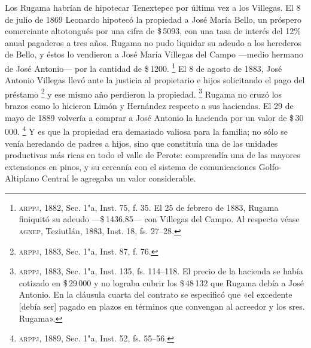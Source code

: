 \documentclass[14pt,twoside,final]{extbook} %
\let\oldfootnote\footnote
\renewcommand\footnote[1]{%
\oldfootnote{\hspace{1mm}#1}}
\begin{document}
Los Rugama habrían de hipotecar Tenextepec por última vez a los Villegas. El 8 de julio de 1869 Leonardo hipotecó la propiedad a José María Bello, un próspero comerciante altotongués por una cifra de \$\,5093, con una tasa de interés del 12\% anual pagaderos a tres años. Rugama no pudo liquidar su adeudo a los herederos de Bello, y éstos lo vendieron a José María Villegas del Campo ---medio hermano de José Antonio--- por la cantidad de \$\,1200.\footnote{\textsc{arppj}, 1882, Sec. 1"a, Inst. 75, f. 35. El 25 de febrero de 1883, Rugama finiquitó su adeudo ---\$\,1436.85--- con Villegas del Campo. Al respecto véase \textsc{agnep}, Teziutlán, 1883, Inst. 18, fs. 27--28.} El 8 de agosto de 1883, José Antonio Villegas llevó ante la justicia al propietario e hijos solicitando el pago del préstamo\footnote{\textsc{arppj}, 1883, Sec. 1"a, Inst. 87, f. 76.} y ese mismo año perdieron la propiedad.\footnote{\textsc{arppj}, 1883, Sec. 1"a, Inst. 135, fs. 114--118. El precio de la hacienda se había cotizado en \$\,29\,000 y no lograba cubrir los \$\,48\,132 que Rugama debía a José Antonio. En la cláusula cuarta del contrato se especificó que «el excedente [debía ser] pagado en plazos en términos que convengan al acreedor y los sres. Rugama».} Rugama no cruzó los brazos como lo hicieron Limón y Hernández respecto a sus haciendas. El 29 de mayo de 1889 volvería a comprar a José Antonio la hacienda por un valor de \$\,30\,000.\footnote{\textsc{arppj}, 1889, Sec. 1"a, Inst. 52, fs. 55--56.} Y es que la propiedad era demasiado valiosa para la familia; no sólo se venía heredando de padres a hijos, sino que constituía una de las unidades productivas más ricas en todo el valle de Perote: comprendía una de las mayores extensiones en pinos, y su cercanía con el sistema de comunicaciones Golfo-Altiplano Central le agregaba un valor considerable.
\end{document}
